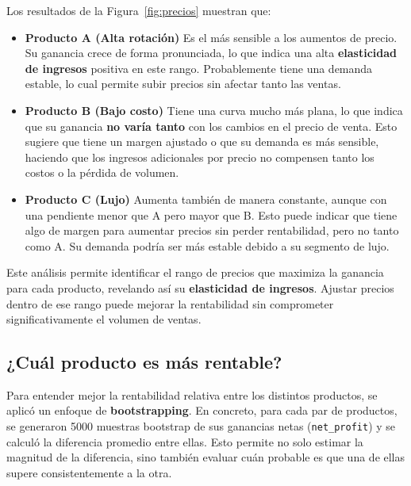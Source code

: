 \documentclass{report}
\begin{document}
        Los resultados de la Figura~\ref{fig:precios} muestran que:
        
        \begin{itemize}
            \item \textbf{Producto A (Alta rotación)}  
            Es el más sensible a los aumentos de precio. Su ganancia crece de forma pronunciada, lo que indica una alta \textbf{elasticidad de ingresos} positiva en este rango. Probablemente tiene una demanda estable, lo cual permite subir precios sin afectar tanto las ventas.
        
            \item \textbf{Producto B (Bajo costo)}  
            Tiene una curva mucho más plana, lo que indica que su ganancia \textbf{no varía tanto} con los cambios en el precio de venta. Esto sugiere que tiene un margen ajustado o que su demanda es más sensible, haciendo que los ingresos adicionales por precio no compensen tanto los costos o la pérdida de volumen.
        
            \item \textbf{Producto C (Lujo)}  
            Aumenta también de manera constante, aunque con una pendiente menor que A pero mayor que B. Esto puede indicar que tiene algo de margen para aumentar precios sin perder rentabilidad, pero no tanto como A. Su demanda podría ser más estable debido a su segmento de lujo.
        \end{itemize}
        
        Este análisis permite identificar el rango de precios que maximiza la ganancia para cada producto, revelando así su \textbf{elasticidad de ingresos}. Ajustar precios dentro de ese rango puede mejorar la rentabilidad sin comprometer significativamente el volumen de ventas.
    
        \subsection{¿Cuál producto es más rentable?}

        Para entender mejor la rentabilidad relativa entre los distintos productos, se aplicó un enfoque de \textbf{bootstrapping}. En concreto, para cada par de productos, se generaron 5000 muestras bootstrap de sus ganancias netas (\texttt{net\_profit}) y se calculó la diferencia promedio entre ellas. Esto permite no solo estimar la magnitud de la diferencia, sino también evaluar cuán probable es que una de ellas supere consistentemente a la otra.
        
\end{document}
